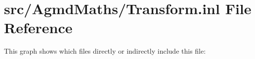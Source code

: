 \hypertarget{_transform_8inl}{\section{src/\+Agmd\+Maths/\+Transform.inl File Reference}
\label{_transform_8inl}
}
This graph shows which files directly or indirectly include this file\+:

